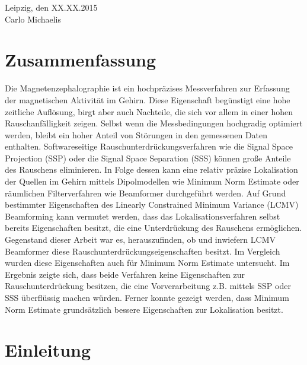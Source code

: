 \documentclass[doc,a4paper,12pt]{apa6}
\begin{document}
\vspace{3em}
\noindent Leipzig, den XX.XX.2015\\ Carlo Michaelis

\newpage

\section*{Zusammenfassung}

Die Magnetenzephalographie ist ein hochpräzises Messverfahren zur Erfassung der magnetischen Aktivität im Gehirn. Diese Eigenschaft begünstigt eine hohe zeitliche Auflösung, birgt aber auch Nachteile, die sich vor allem in einer hohen Rauschanfälligkeit zeigen. Selbst wenn die Messbedingungen hochgradig optimiert werden, bleibt ein hoher Anteil von Störungen in den gemessenen Daten enthalten. Softwareseitige Rauschunterdrückungsverfahren wie die Signal Space Projection (SSP) oder die Signal Space Separation (SSS) können große Anteile des Rauschens eliminieren. In Folge dessen kann eine relativ präzise Lokalisation der Quellen im Gehirn mittels Dipolmodellen wie Minimum Norm Estimate oder räumlichen Filterverfahren wie Beamformer durchgeführt werden. Auf Grund bestimmter Eigenschaften des Linearly Constrained Minimum Variance (LCMV) Beamforming kann vermutet werden, dass das Lokalisationsverfahren selbst bereits Eigenschaften besitzt, die eine Unterdrückung des Rauschens ermöglichen. Gegenstand dieser Arbeit war es, herauszufinden, ob und inwiefern LCMV Beamformer diese Rauschunterdrückungseigenschaften besitzt. Im Vergleich wurden diese Eigenschaften auch für Minimum Norm Estimate untersucht. Im Ergebnis zeigte sich, dass beide Verfahren keine Eigenschaften zur Rauschunterdrückung besitzen, die eine Vorverarbeitung z.B. mittels SSP oder SSS überflüssig machen würden. Ferner konnte gezeigt werden, dass Minimum Norm Estimate grundsätzlich bessere Eigenschaften zur Lokalisation besitzt.

\newpage

\setcounter{tocdepth}{2}
\tableofcontents
\newpage

\listoffigures
\newpage

\section{Einleitung}
\end{document}
